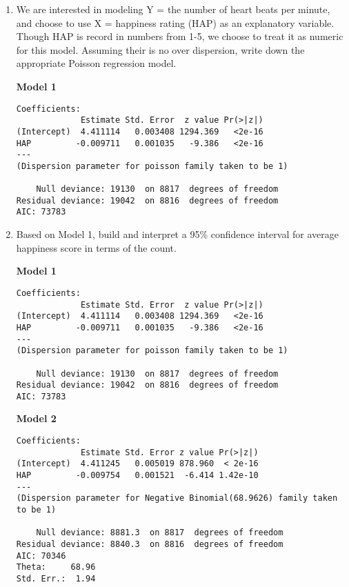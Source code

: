 \documentclass[11pt]{article}
\begin{document}
\begin{enumerate}
\item We are interested in modeling Y = the number of heart beats per minute, and choose to use X = happiness rating (HAP) as an explanatory variable. Though HAP is record in numbers from 1-5, we choose to treat it as numeric for this model.  Assuming their is no over dispersion, write down the appropriate Poisson regression model. 


\vspace{4cm}


\textbf{Model 1} 

\begin{verbatim}
Coefficients:
             Estimate Std. Error  z value Pr(>|z|)    
(Intercept)  4.411114   0.003408 1294.369   <2e-16 
HAP         -0.009711   0.001035   -9.386   <2e-16 
---
(Dispersion parameter for poisson family taken to be 1)

    Null deviance: 19130  on 8817  degrees of freedom
Residual deviance: 19042  on 8816  degrees of freedom
AIC: 73783
\end{verbatim}

\item  Based on Model 1, build and interpret a 95\% confidence interval for average happiness score in terms of the count. 

\pagebreak


\textbf{Model 1} 

\begin{verbatim}
Coefficients:
             Estimate Std. Error  z value Pr(>|z|)    
(Intercept)  4.411114   0.003408 1294.369   <2e-16 
HAP         -0.009711   0.001035   -9.386   <2e-16 
---
(Dispersion parameter for poisson family taken to be 1)

    Null deviance: 19130  on 8817  degrees of freedom
Residual deviance: 19042  on 8816  degrees of freedom
AIC: 73783
\end{verbatim}

\textbf{Model 2} 

\begin{verbatim}
Coefficients:
             Estimate Std. Error z value Pr(>|z|)    
(Intercept)  4.411245   0.005019 878.960  < 2e-16 
HAP         -0.009754   0.001521  -6.414 1.42e-10 
---
(Dispersion parameter for Negative Binomial(68.9626) family taken to be 1)

    Null deviance: 8881.3  on 8817  degrees of freedom
Residual deviance: 8840.3  on 8816  degrees of freedom
AIC: 70346
Theta:     68.96 
Std. Err.:  1.94 
\end{verbatim}


\end{enumerate}
\end{document}
